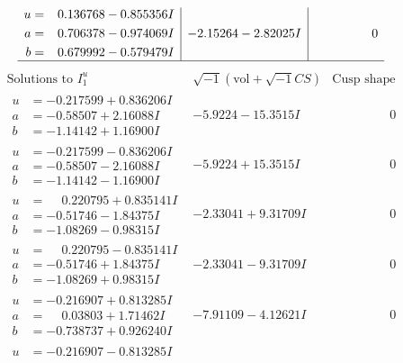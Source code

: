 \documentclass[1p]{elsarticle_modified}
\theoremstyle{definition}
\newcommand{\I}{\sqrt{-1}}
\begin{document}
$$\begin{array}{c|c|c}
\begin{aligned}
u &= \phantom{-}0.136768 - 0.855356 I \\
a &= \phantom{-}0.706378 - 0.974069 I \\
b &= \phantom{-}0.679992 - 0.579479 I\end{aligned}
 & -2.15264 - 2.82025 I & \phantom{-0.000000 } 0\\
 \hline 
 \end{array}$$\newpage$$\begin{array}{c|c|c}  
\text{Solutions to }I^u_{1}& \I (\text{vol} + \sqrt{-1}CS) & \text{Cusp shape}\\
 \hline 
\begin{aligned}
u &= -0.217599 + 0.836206 I \\
a &= -0.58507 + 2.16088 I \\
b &= -1.14142 + 1.16900 I\end{aligned}
 & -5.9224 - 15.3515 I & \phantom{-0.000000 } 0 \\ \hline\begin{aligned}
u &= -0.217599 - 0.836206 I \\
a &= -0.58507 - 2.16088 I \\
b &= -1.14142 - 1.16900 I\end{aligned}
 & -5.9224 + 15.3515 I & \phantom{-0.000000 } 0 \\ \hline\begin{aligned}
u &= \phantom{-}0.220795 + 0.835141 I \\
a &= -0.51746 - 1.84375 I \\
b &= -1.08269 - 0.98315 I\end{aligned}
 & -2.33041 + 9.31709 I & \phantom{-0.000000 } 0 \\ \hline\begin{aligned}
u &= \phantom{-}0.220795 - 0.835141 I \\
a &= -0.51746 + 1.84375 I \\
b &= -1.08269 + 0.98315 I\end{aligned}
 & -2.33041 - 9.31709 I & \phantom{-0.000000 } 0 \\ \hline\begin{aligned}
u &= -0.216907 + 0.813285 I \\
a &= \phantom{-}0.03803 + 1.71462 I \\
b &= -0.738737 + 0.926240 I\end{aligned}
 & -7.91109 - 4.12621 I & \phantom{-0.000000 } 0 \\ \hline\begin{aligned}
u &= -0.216907 - 0.813285 I \\

\end{aligned}
\end{array}$$
\end{document}
